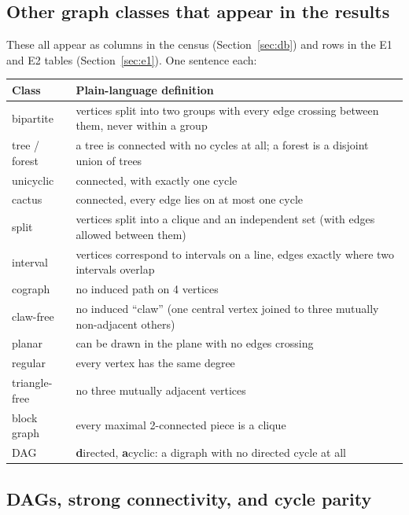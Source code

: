 \documentclass[11pt]{article}
\theoremstyle{plain}
\theoremstyle{definition}
\theoremstyle{remark}
\begin{document}
\subsection{Other graph classes that appear in the results}

These all appear as columns in the census (Section~\ref{sec:db}) and rows in the E1
and E2 tables (Section~\ref{sec:e1}). One sentence each:

\begin{center}
\begin{tabular}{@{}p{3.1cm}p{10.5cm}@{}}
\toprule
\textbf{Class} & \textbf{Plain-language definition} \\
\midrule
bipartite & vertices split into two groups with every edge crossing between them, never within a group \\
tree / forest & a tree is connected with no cycles at all; a forest is a disjoint union of trees \\
unicyclic & connected, with exactly one cycle \\
cactus & connected, every edge lies on at most one cycle \\
split & vertices split into a clique and an independent set (with edges allowed between them) \\
interval & vertices correspond to intervals on a line, edges exactly where two intervals overlap \\
cograph & no induced path on 4 vertices \\
claw-free & no induced ``claw'' (one central vertex joined to three mutually non-adjacent others) \\
planar & can be drawn in the plane with no edges crossing \\
regular & every vertex has the same degree \\
triangle-free & no three mutually adjacent vertices \\
block graph & every maximal 2-connected piece is a clique \\
DAG & \textbf{d}irected, \textbf{a}cyclic: a digraph with no directed cycle at all \\
\bottomrule
\end{tabular}
\end{center}

\subsection{DAGs, strong connectivity, and cycle parity}
\end{document}
